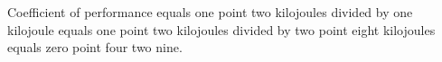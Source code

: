 Coefficient of performance equals one point two kilojoules divided by one kilojoule equals one point two kilojoules divided by two point eight kilojoules equals zero point four two nine.
